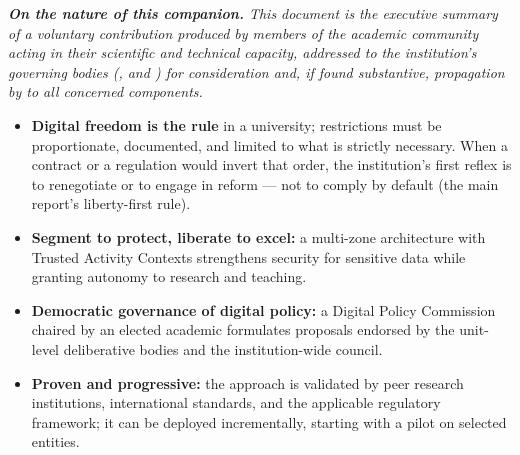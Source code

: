 
\noindent\textit{\textbf{On the nature of this companion.}
This document is the executive summary of a voluntary contribution
produced by members of the academic community acting in their
scientific and technical capacity, addressed to the
institution's governing bodies (, and
) for
consideration and, if found substantive, propagation by
 to all concerned components.}

\bigskip


\begin{tcolorbox}[
    colback=NavyBlue!6!white,
    colframe=NavyBlue!80!black,
    boxrule=0.8pt,
    arc=2pt,
    left=10pt, right=10pt, top=8pt, bottom=8pt,
    title={\textbf{Key messages}}
]
\begin{itemize}[nosep, leftmargin=1em]
    \item \textbf{Digital freedom is the rule} in a university; restrictions
    must be proportionate, documented, and limited to what is strictly
    necessary. When a contract or a regulation would invert that order,
    the institution's first reflex is to renegotiate or to engage in
    reform --- not to comply by default (the main report's
    liberty-first rule).
    \item \textbf{Segment to protect, liberate to excel:} a multi-zone
    architecture with Trusted Activity Contexts strengthens security
    for sensitive data while granting autonomy to research and teaching.
    \item \textbf{Democratic governance of digital policy:} a Digital
    Policy Commission chaired by an elected academic formulates proposals
    endorsed by the unit-level deliberative bodies and the
    institution-wide council.
    \item \textbf{Proven and progressive:} the approach is validated by
    peer research institutions, international standards, and the
    applicable regulatory framework; it can be deployed incrementally, starting with a pilot
    on selected entities.
\end{itemize}
\end{tcolorbox}

